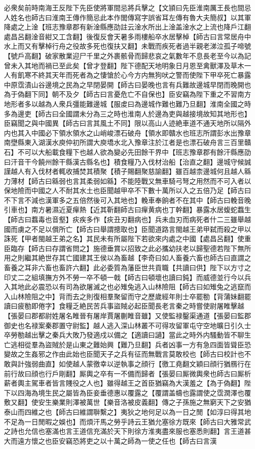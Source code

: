 必衆矣前時南海王反陛下先臣使將軍間忌將兵擊之【文頴曰先臣淮南厲王長也間忌人姓名也師古曰淮南王傳作簡忌此本作閭傳寫字誤省耳左傳有魯大夫簡叔】以其軍降處之上淦【班志豫章郡有新淦縣應劭註云淦水所出上淦盖淦水之上流也降戶江翻處昌呂翻淦音紺又工含翻】後復反會天暑多雨樓船卒水居擊棹【師古曰言常居舟中水上而又有擊棹行舟之役故多死也復扶又翻】未戰而疾死者過半親老涕泣孤子啼號【號戶高翻】破家散業迎尸千里之外裹骸骨而歸悲哀之氣數年不息長老至今以為記曾未入其地而禍已至此矣【曾才登翻】陛下德配天地明象日月恩至禽獸澤及草木一人有飢寒不終其天年而死者為之悽愴於心今方内無狗吠之警而使陛下甲卒死亡暴露中原霑漬山谷邊境之民為之早閉晏開【師古曰晏晚也言有兵難故邊城早閉而晚開也為于偽翻下同】朝不及夕【師古曰言憂危亡不自保也】臣安竊為陛下重之不習南方地形者多以越為人衆兵彊能難邊城【服䖍曰為邊城作難也難乃旦翻】淮南全國之時多為邊吏【師古曰全國謂未分為三之時也淮南人於邊為吏與越接境故知其地形也】臣竊聞之與中國異【師古曰言其風土不同】限以高山人迹絶車道不通天地所以隔外内也其入中國必下領水領水之山峭峻漂石破舟【領水即贛水也班志所謂彭水出豫章南壄縣東入湖漢水庾仲初所謂大庾墧水北入豫章注於江者是也漂石破舟言三百里贛石】不可以大船載食糧下也越人欲為變必先田餘干界中【班志豫章郡有餘汗縣應劭曰汗音干今饒州餘干縣漢古縣名也】積食糧乃入伐材治船【治直之翻】邊城守候誠謹越人有入伐材者輒收捕焚其積聚【積子賜翻聚慈諭翻】雖百越柰邊城何且越人緜力薄材【師古曰緜弱也言其柔弱如緜】不能陸戰又無車騎弓弩之用然而不可入者以保地險而中國之人不耐其水土也臣聞越甲卒不下數十萬所以入之五倍乃足【師古曰不下言不減也漢軍多之五倍然後可入其地也】輓車奉餉者不在其中【師古曰輓音晚引車也】南方暑濕近夏癉熱【近其靳翻師古曰癉黄病也丁幹翻】暴露水居蝮蛇蠚生【師古曰蠚毒也音壑】疢疾多作【疢丑刃翻病也】兵未血刃而病死者什二三雖舉越國而虜之不足以償所亡【師古曰舉謂摠取也】臣聞道路言閩越王弟甲弑而殺之甲以誅死【甲者閩越王弟之名】其民未有所屬陛下若欲來内處之中國【處昌呂翻】使重臣臨存【師古曰存謂省問之】施德垂賞以招致之此必攜幼扶老以歸聖德若陛下無所用之則繼其絶世存其亡國建其王侯以為畜越【李奇曰如人畜養六畜也師古曰直謂之畜養之耳非六畜也畜許六翻】此必委質為藩臣世共貢職【共讀曰供】陛下以方寸之印丈二之組填撫方外不勞一卒不頓一戟【師古曰頓壞也讀曰鈍】而威德並行今以兵入其地此必震恐以有司為欲屠滅之也必雉兔逃入山林險阻【師古曰如雉兔之逃竄而入山林險阻之中】背而去之則復相羣聚留而守之歷歲經年則士卒罷勌【背蒲妹翻罷讀曰疲勌即倦字】食糧乏絶民苦兵事盜賊必起臣聞長老言秦之時嘗使尉屠睢擊越【張晏曰郡都尉姓屠名睢晉有屠岸賈屠蒯睢音雖】又使監禄鑿渠通道【張晏曰監郡御史也名禄案秦郡置守尉監】越人逃入深山林叢不可得攻留軍屯守空地曠日引久士卒勞勌越出擊之秦兵大敗乃發適戍以備之【適讀曰讁】當此之時外内騷動皆不聊生亡逃相從羣為盜賊於是山東之難始興【難乃旦翻】兵者凶事一方有急四面皆聳臣恐變故之生姦邪之作由此始也臣聞天子之兵有征而無戰言莫敢校也【師古曰校計也不敢與計強弱曲直】如使越人蒙徼幸以逆執事之顔行【徼工堯翻文穎曰顔行猶鴈行在前行故曰顔也行戶剛翻】厮輿之卒有一不備而歸者【張晏曰厮微輿衆也師古曰厮析薪者輿主駕車者皆言賤役之人也】雖得越王之首臣猶竊為大漢羞之【為于偽翻】陛下以四海為境生民之屬皆為臣妾垂德惠以覆露之【覆謂盖幬也露謂使之霑潤澤也覆敷又翻】使安生樂業則澤被萬世【樂音洛被皮義翻】傳之子孫施之無窮天下之安猶泰山而四維之也【師古曰維謂聨繫之】夷狄之地何足以為一日之閒【如淳曰得其地不足為一日閒暇之娛也】而煩汗馬之勞乎詩云王猶允塞徐方既來【師古曰大雅常武之詩也允信也塞滿也言王道信充滿於天下則徐方淮夷盡來服也塞悉則翻】言王道甚大而遠方懷之也臣安竊恐將吏之以十萬之師為一使之任也【師古曰言漢
